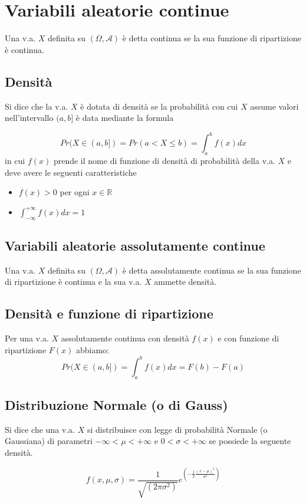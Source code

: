 \documentclass[a4paper]{report}
\begin{document}
  \section{Variabili aleatorie continue}
  Una v.a. $X$ definita su $(\Omega, \mathcal{A})$ è detta continua se la sua funzione di ripartizione è continua.

  \subsection{Densità}
  Si dice che la v.a. $X$ è dotata di densità se la probabilità con cui $X$ assume valori nell'intervallo $(a,b]$ è data mediante la formula

  \[ Pr(X \in (a,b]) = Pr(a < X \leqslant b) = \int_{a}^{b} f(x)  dx \]
  in cui $f(x)$ prende il nome di funzione di densità di probabilità della v.a. $X$ e deve avere le seguenti caratteristiche
  \begin{itemize}
    \item $f(x) > 0$ per ogni $x \in \mathbb{R}$
    \item $\int_{-\infty}^{+\infty} f(x) dx = 1$
  \end{itemize}

  \subsection{Variabili aleatorie assolutamente continue}
  Una v.a. $X$ definita su $(\Omega, \mathcal{A})$ è detta assolutamente continua se la sua funzione di ripartizione è continua e la sua v.a. $X$ ammette densità.

  \subsection{Densità e funzione di ripartizione}
  Per una v.a. $X$ assolutamente continua con densità $f(x)$ e con funzione di ripartizione $F(x)$ abbiamo:
  \[ Pr(X \in (a,b]) = \int_{a}^{b} f(x) dx = F(b) - F(a) \]

  \subsection{Distribuzione Normale (o di Gauss)}
  Si dice che una v.a. $X$ si distribuisce con legge di probabilità Normale (o Gaussiana) di parametri $-\infty < \mu < +\infty$ e $ 0 < \sigma < +\infty$ se possiede la seguente densità.

  \[ f(x,\mu,\sigma) = \frac{1}{\sqrt{(2 \pi \sigma^2)}} e^{( -\frac{1}{2} \frac{(x-\mu)^2}{\sigma^2})} \]
\end{document}
